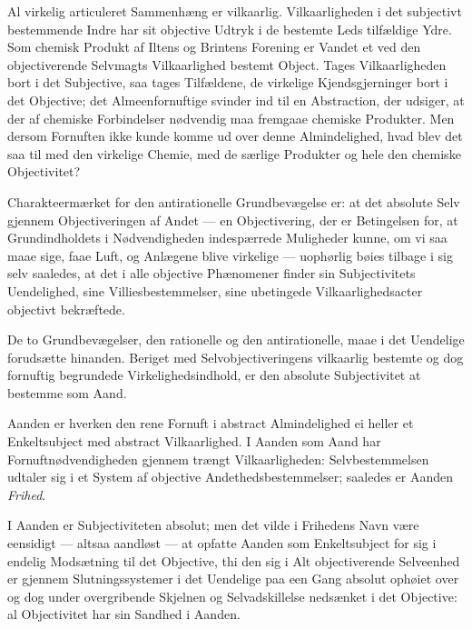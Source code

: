 \documentclass[12pt]{book}
\newcommand{\opage}[1]{\marginnote{\footnotesize\textit{[#1]}}}
\begin{document}
Al virkelig articuleret Sammenhæng er vilkaarlig. Vilkaarligheden i
det subjectivt bestemmende Indre har sit objective Udtryk i de
bestemte Leds tilfældige Ydre. Som chemisk Produkt af Iltens og
Brintens Forening er Vandet et ved den objectiverende Selvmagts
Vilkaarlighed bestemt Object. Tages Vilkaarligheden bort i det
Subjective, saa tages Tilfældene, de virkelige Kjendsgjerninger bort
i det Objective; det Almeenfornuftige svinder ind til en
Abstraction, der udsiger, at der af chemiske Forbindelser nødvendig
maa fremgaae chemiske Produkter. Men dersom Fornuften ikke kunde
komme ud over denne Almindelighed, hvad blev det saa til med den
virkelige Chemie, med de særlige Produkter og hele den chemiske
Objectivitet?

Charakteermærket for den antirationelle Grundbevægelse er: at det
absolute Selv gjennem Objectiveringen af Andet --- en Objectivering,
der er Betingelsen for, at Grundindholdets i Nødvendigheden
indespærrede Muligheder kunne, om vi saa maae sige, faae Luft, og
Anlægene blive virkelige --- uophørlig bøies tilbage i sig selv
saaledes, at det i alle objective Phænomener finder sin
Subjectivitets Uendelighed, sine Villiesbestemmelser, sine
ubetingede Vilkaarlighedsacter objectivt bekræftede.

De to Grundbevægelser, den rationelle og den antirationelle, maae i
det Uendelige forudsætte hinanden. Beriget med Selvobjectiveringens
vilkaarlig bestemte og dog fornuftig begrundede Virkelighedsindhold,
er den absolute Subjectivitet at bestemme som Aand.

Aanden er hverken den rene Fornuft i abstract Almindelighed ei
heller et Enkeltsubject med abstract Vilkaarlighed. I Aanden som
Aand har Fornuftnødvendigheden gjennem\-%
\opage{82}trængt Vilkaarligheden: Selvbestemmelsen udtaler sig i et System af
objective Andethedsbestemmelser; saaledes er Aanden \emph{Frihed}.

I Aanden er Subjectiviteten absolut; men det vilde i Frihedens Navn
være eensidigt --- altsaa aandløst --- at opfatte Aanden som
Enkeltsubject for sig i endelig Modsætning til det Objective, thi
den sig i Alt objectiverende Selveenhed er gjennem Slutningssystemer
i det Uendelige paa een Gang absolut ophøiet over og dog under
overgribende Skjelnen og Selvadskillelse nedsænket i det Objective:
al Objectivitet har sin Sandhed i Aanden.
\end{document}
